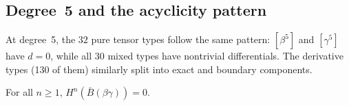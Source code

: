 \subsection{Degree~5 and the acyclicity pattern}

At degree~5, the $32$ pure tensor types follow the same pattern:
$[\beta^5]$ and $[\gamma^5]$ have $d = 0$, while all $30$ mixed
types have nontrivial differentials.  The derivative types (130 of
them) similarly split into exact and boundary components.

\begin{proposition}
\label{prop:betagamma-bar-acyclicity}
For all $n \geq 1$, $H^n(\bar{B}(\beta\gamma)) = 0$.
\end{proposition}

